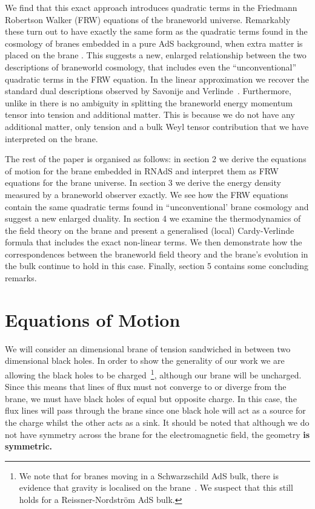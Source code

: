 \documentclass[a4paper,12pt]{article}
\begin{document}
We find that this exact approach introduces quadratic terms in the
Friedmann Robertson Walker (FRW) equations of the braneworld
universe. Remarkably these turn out to have exactly the same form as
the quadratic terms found in the cosmology of branes embedded in a
pure AdS background, when extra matter is placed on the brane
\cite{Binetruy:branecos1,Binetruy:branecos2}. This suggests a new,
enlarged relationship between the two descriptions of braneworld
cosmology, that includes even the ``unconventional'' quadratic terms
in the FRW equation.  In the linear approximation we recover the
standard dual descriptions observed by Savonije and
Verlinde~\cite{Verlinde:radiation,Savonije:braneCFT}.  Furthermore,
unlike in \cite{Binetruy:branecos1,Binetruy:branecos2} there is no
ambiguity in splitting the braneworld energy momentum tensor into
tension and additional matter. This is because we do not have any
additional matter, only tension and a bulk Weyl tensor contribution
that we have interpreted on the brane.

The rest of the paper is organised as follows: in section 2 we derive
the equations of motion for the brane embedded in RNAdS and interpret
them as FRW equations for the brane universe. In section 3 we derive
the energy density measured by a braneworld observer exactly. We see
how the FRW equations contain the same quadratic terms found in
``unconventional' brane cosmology and suggest a new enlarged
duality. In section 4 we examine the thermodynamics of the field
theory on the brane and present a generalised (local) Cardy-Verlinde
formula that includes the exact non-linear terms. We then demonstrate
how the correspondences between the braneworld field theory and the
brane's evolution in the bulk continue to hold in this case. Finally,
section 5 contains some concluding remarks.

\section{Equations of Motion} \label{section:eom}

We will consider an \coordHE{} dimensional brane of tension \myHighlight{$\sigma$}\coordHE{}
sandwiched in between two \coordHE{} dimensional black holes. In order to
show the generality of our work we are allowing the black holes to be
charged~\footnote{We note that for branes moving in a Schwarzschild
AdS bulk, there is evidence that gravity is localised on the
brane~\cite{Singh:local}.  We suspect that this still holds for a
Reissner-Nordstr\"om AdS bulk.}, although our brane will be
uncharged. Since this means that lines of flux must not converge to or
diverge from the brane, we must have black holes of equal but opposite
charge. In this case, the flux lines will pass through the brane since
one black hole will act as a source for the charge whilst the other
acts as a sink. It should be noted that although we do not have
\coordHE{} symmetry across the brane for the electromagnetic
field, the geometry \bf{is} \rm {}\coordHE{} symmetric.
\end{document}
